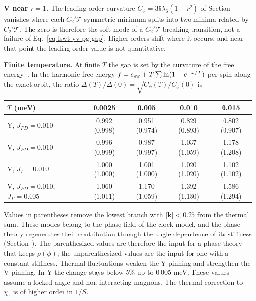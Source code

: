 \textbf{V near \(r=1\).} The leading-order curvature
\(C_\phi=36\lambda_6(1-r^2)\) of Section~
vanishes where each \(C_2'\mathcal T\)-symmetric minimum splits into two
minima related by \(C_2'\mathcal T\). The zero is therefore the soft mode
of a \(C_2'\mathcal T\)-breaking transition, not a failure of
Eq.~\eqref{eq-lswt-yv-pg-gap}. Higher orders shift where it occurs, and
near that point the leading-order value is not quantitative.

\textbf{Finite temperature.} At finite \(T\) the gap is set by the
curvature of the free energy~\cite{lin2025}. In the harmonic free energy
\(f=e_{\rm sw}+T\sum\ln(1-e^{-\omega/T})\) per spin along the exact
orbit, the ratio \(\Delta(T)/\Delta(0)=\sqrt{C_\phi(T)/C_\phi(0)}\) is
\begin{center}
\small
\begin{tabular}{@{}lcccc@{}}
\toprule
\(T\) (meV) & 0.0025 & 0.005 & 0.010 & 0.015\\
\midrule
Y, \(J_{PD}=0.010\) & 0.992 (0.998) & 0.951 (0.974) & 0.829 (0.893) & 0.802 (0.907)\\
V, \(J_{PD}=0.010\) & 0.996 (0.999) & 0.987 (0.997) & 1.037 (1.059) & 1.178 (1.208)\\
V, \(J_\Gamma=0.010\) & 1.000 (1.000) & 1.001 (1.000) & 1.020 (1.020) & 1.102 (1.102)\\
V, \(J_{PD}=0.010\), \(J_\Gamma=0.005\) & 1.060 (1.011) & 1.170 (1.059) & 1.392 (1.180) & 1.586 (1.294)\\
\bottomrule
\end{tabular}
\end{center}
Values in parentheses remove the lowest branch with
\(|\mathbf k|<0.25\) from the thermal sum. Those modes belong to the
phase field of the clock model, and the phase theory regenerates their
contribution through the angle dependence of its stiffness
(Section~). The parenthesized values are
therefore the input for a phase theory that keeps \(\rho(\phi)\); the
unparenthesized values are the input for one with a constant stiffness.
Thermal fluctuations weaken the Y pinning and strengthen the V pinning.
In Y the change stays below 5\% up to 0.005 meV. These values assume a
locked angle and non-interacting magnons. The thermal correction to
\(\chi_z\) is of higher order in \(1/S\).


